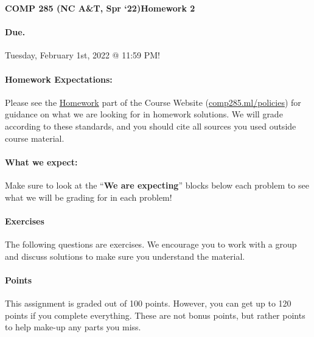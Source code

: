 \documentclass [12pt]{article}
\begin{document}
 

{\LARGE \textbf {COMP 285 (NC A\&T, Spr `22)}\hfill \textbf {Homework 2} } 
\vspace {1em} 
\begin {Instruction} 

\paragraph {Due.} Tuesday, February 1st, 2022 @ 11:59 PM!
\end {Instruction} 

\vspace {1em} 
\begin {Instruction} \paragraph {Homework Expectations:} Please see the \href{https://www.comp285.ml/homework/#general-homework-information}{Homework} part of the Course Website (\href{https://www.comp285.ml/policies/#collaboration-policy-and-honor-code}{comp285.ml/policies}) for guidance on what we are looking for in homework solutions. We will grade according to these standards, and you should cite all sources you used outside course material.

\paragraph {What we expect:} Make sure to look at the ``\textbf {We are expecting}'' blocks below each problem to see what we will be grading for in each problem! \end {Instruction}

\vspace {1em} 
\begin {Instruction} 

\paragraph {Exercises} The following questions are exercises. We encourage you to work with a group and discuss solutions to make sure you understand the material.

\paragraph {Points} This assignment is graded out of 100 points. However, you can get up to 120 points if you complete everything. These are not bonus points, but rather points to help make-up any parts you miss.

\end {Instruction} 
\end{document}

